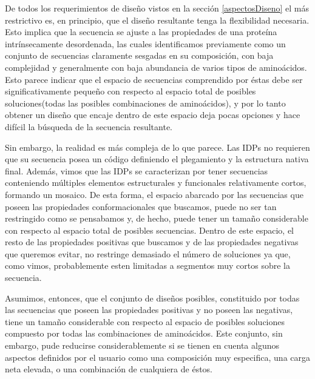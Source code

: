 De todos los requerimientos de diseño vistos en la sección \ref{aspectosDiseno} el más restrictivo es, en principio, que el diseño resultante tenga la flexibilidad necesaria. 
Esto implica que la secuencia se ajuste a las propiedades de una proteína intrínsecamente desordenada, las cuales identificamos previamente como un conjunto de secuencias 
claramente sesgadas en su composición, con baja complejidad y generalmente con baja abundancia de varios tipos de aminoácidos.
Esto parece indicar que el espacio de secuencias comprendido por éstas debe ser significativamente pequeño con respecto al espacio total de posibles soluciones(todas las posibles combinaciones de aminoácidos),
y por lo tanto obtener un diseño que encaje dentro de este espacio deja pocas opciones y hace difícil la búsqueda de la secuencia resultante.

Sin embargo, la realidad es más compleja de lo que parece.
Las IDPs no requieren que su secuencia posea un código definiendo el plegamiento y la estructura nativa final. 
Además, vimos que las IDPs se caracterizan por tener secuencias conteniendo múltiples elementos estructurales y funcionales relativamente cortos, formando un mosaico. 
De esta forma, el espacio abarcado por las secuencias que poseen las propiedades conformacionales que buscamos, puede no ser tan restringido como se pensabamos y, de hecho,
puede tener un tamaño considerable con respecto al espacio total de posibles secuencias.
Dentro de este espacio, el resto de las propiedades positivas que buscamos y de las propiedades negativas que queremos evitar, no restringe demasiado el número de soluciones
ya que, como vimos, probablemente esten limitadas a segmentos muy cortos sobre la secuencia.

Asumimos, entonces, que el conjunto de diseños posibles, constituido por todas las secuencias que poseen las propiedades positivas y 
no poseen las negativas, tiene un tamaño considerable con respecto al espacio de posibles soluciones compuesto por todas las combinaciones de aminoácidos.
Este conjunto, sin embargo, pude reducirse considerablemente si se tienen en cuenta algunos aspectos definidos por el usuario 
como una composición muy especifica, una carga neta elevada, o una combinación de cualquiera de éstos. 















